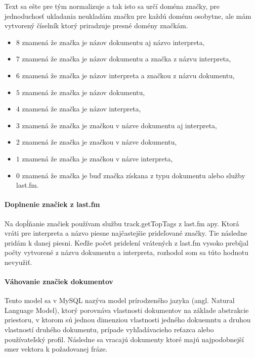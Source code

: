 Text sa ešte pre tým normalizuje a tak isto sa určí doména značky, pre jednoduchosť 
ukladania neukladám značku pre každú doménu osobytne, ale mám vytvorený číselník
ktorý priradzuje presné domény značkám. 

\begin{itemize}
\item{\(8\) znamená že značka je názov dokumentu aj názvo interpreta,}
\item{\(7\) znamená že značka je názov dokumentu a značka z názvu interpreta,}
\item{\(6\) znamená že značka je názov interpreta a značkou z názvu dokumentu,}
\item{\(5\) znamená že značka je názov dokumentu,}
\item{\(4\) znamená že značka je názov interpreta,}
\item{\(3\) znamená že značka je značkou v názve dokumentu aj interpreta,}
\item{\(2\) znamená že značka je značkou v názve dokumentu,}
\item{\(1\) znamená že značka je značkou v názve interpreta,}
\item{\(0\) znamená že značka je buď značka získana z typu dokumentu alebo služby last.fm.}
\end{itemize}

\paragraph{Doplnenie značiek z last.fm}

Na dopĺňanie značiek používam službu track.getTopTags z last.fm apy. Ktorá 
vráti pre interpreta a názvo piesne najčastejšie prideľované značky. Tie následne
pridám k danej piesni. Keďže počet pridelení vrátených z last.fm vysoko prebíjal
počty vytvorené z názvu dokumentu a interpreta, rozhodol som sa túto hodnotu 
nevyužiť.

\paragraph{Váhovanie značiek dokumentov}

Tento model sa v MySQL nazýva model prírodzeného jazyka (angl. Natural Language Model),
ktorý porovnáva vlastnosti dokumentov na základe abstrakcie priestoru,
v ktorom sú jednou dimenziou vlastnosti jedného dokuemntu a druhou vlastností druhého
dokumentu, prípade vyhľadávacieho reťazca alebo používateľský profil.
Následne sa vracajú dokumenty ktoré majú najpodobnejší smer vektora k požadovanej fráze.

